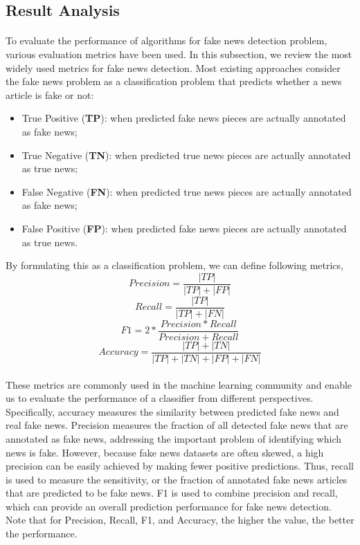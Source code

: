 \documentclass[11.5pt]{article}
\begin{document}
\begin{multicols}{2}
\section{Result Analysis}
\paragraph{}
To evaluate the performance of algorithms for fake news detection problem, various evaluation metrics have been used. In this subsection, we review the most widely used metrics for fake news detection. Most existing approaches consider the fake news problem as a classiﬁcation problem that predicts whether a news article is fake or not:
\begin{itemize}
    \item True Positive (\textbf{TP}): when predicted fake news pieces are actually annotated as fake news;
    \item True Negative (\textbf{TN}): when predicted true news pieces are actually annotated as true news;
    \item False Negative (\textbf{FN}): when predicted true news pieces are actually annotated as fake news;
    \item False Positive (\textbf{FP}): when predicted fake news pieces are actually annotated as true news.
\end{itemize}
By formulating this as a classiﬁcation problem, we can deﬁne following metrics,
\begin{equation}
    Precision = \frac{|TP|}{|TP|+|FP|}
\end{equation}
\begin{equation}
    Recall = \frac{|TP|}{|TP|+|FN|}
\end{equation}
\begin{equation}
    F1 = 2 * \frac{Precision * Recall}{Precision + Recall}
\end{equation}
\begin{equation}
    Accuracy = \frac{|TP| + |TN|}{|TP| + |TN| + |FP| + |FN|}
\end{equation}
\paragraph{}
These metrics are commonly used in the machine learning community and enable us to evaluate the performance of a classiﬁer from diﬀerent perspectives. Speciﬁcally, accuracy measures the similarity between predicted fake news and real fake news. Precision measures the fraction of all detected fake news that are annotated as fake news, addressing the important problem of identifying which news is fake. However, because fake news datasets are often skewed, a high precision can be easily achieved by making fewer positive predictions. Thus, recall is used to measure the sensitivity, or the fraction of annotated fake news articles that are predicted to be fake news. F1 is used to combine precision and recall, which can provide an overall prediction performance for fake news detection. Note that for Precision, Recall, F1, and Accuracy, the higher the value, the better the performance. 

\end{multicols}
\end{document}
